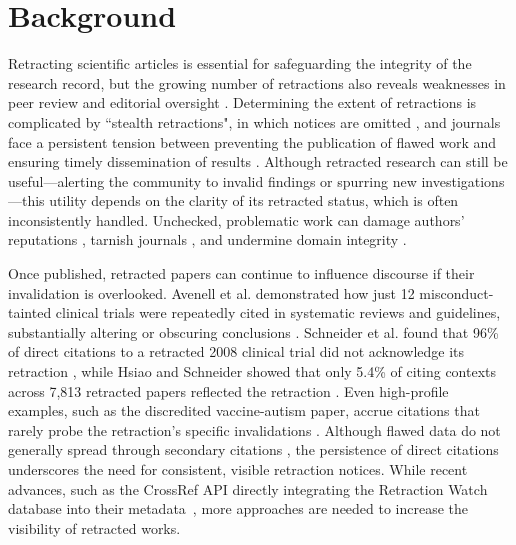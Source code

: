 \documentclass[pdflatex,sn-mathphys-num]{sn-jnl}
\begin{document}

\maketitle

\section{Background}\label{sec1}

Retracting scientific articles is essential for safeguarding the integrity of the research record, but the growing number of retractions also reveals weaknesses in peer review and editorial oversight \cite{steen_retractions_2011-1, steen_retractions_2011,Steen2013-rr, Kuhberger2022-if}. Determining the extent of retractions is complicated by ``stealth retractions", in which notices are omitted \cite{teixeira_da_silva_silent_2016}, and journals face a persistent tension between preventing the publication of flawed work and ensuring timely dissemination of results \cite{perera_recent_2017}. Although retracted research can still be useful—alerting the community to invalid findings or spurring new investigations—this utility depends on the clarity of its retracted status, which is often inconsistently handled. Unchecked, problematic work can damage authors' reputations \cite{kearney_research_2024}, tarnish journals \cite{congiunti_ethics_2023, collaborative_working_group_from_the_conference_keeping_the_pool_clean_prevention_and_management_of_misconduct_related_retractions_repair_2018}, and undermine domain integrity \cite{Grey2024}.

Once published, retracted papers can continue to influence discourse if their invalidation is overlooked. Avenell et al. demonstrated how just 12 misconduct-tainted clinical trials were repeatedly cited in systematic reviews and guidelines, substantially altering or obscuring conclusions \cite{Avenelle031909}. Schneider et al. found that 96\% of direct citations to a retracted 2008 clinical trial did not acknowledge its retraction \cite{schneider_continued_2020}, while Hsiao and Schneider showed that only 5.4\% of citing contexts across 7,813 retracted papers reflected the retraction \cite{10.1162/qss_a_00155}. Even high-profile examples, such as the discredited vaccine-autism paper, accrue citations that rarely probe the retraction’s specific invalidations \cite{heibi_qualitative_2021}. Although flawed data do not generally spread through secondary citations \cite{van_der_vet_propagation_2016}, the persistence of direct citations underscores the need for consistent, visible retraction notices. While recent advances, such as the CrossRef API directly integrating the Retraction Watch database into their metadata~\cite{rittman_retraction_2025}, more approaches are needed to increase the visibility of retracted works.
\end{document}
